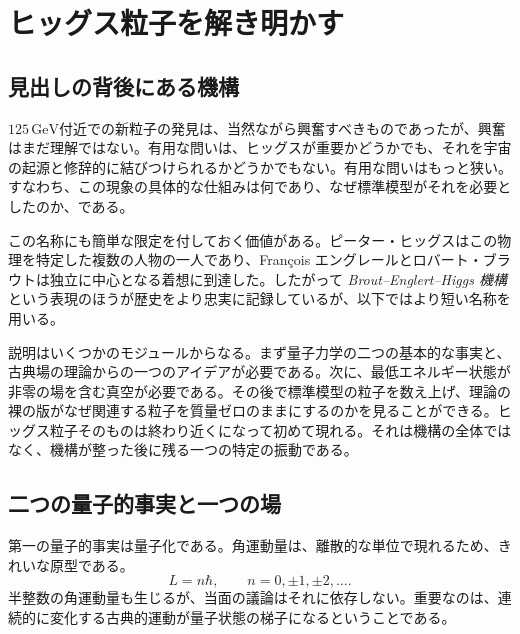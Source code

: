 \chapter{ヒッグス粒子を解き明かす}


\section{見出しの背後にある機構}

$125\,\mathrm{GeV}$付近での新粒子の発見は、当然ながら興奮すべきものであったが、興奮はまだ理解ではない。有用な問いは、ヒッグスが重要かどうかでも、それを宇宙の起源と修辞的に結びつけられるかどうかでもない。有用な問いはもっと狭い。すなわち、この現象の具体的な仕組みは何であり、なぜ標準模型がそれを必要としたのか、である。

この名称にも簡単な限定を付しておく価値がある。ピーター・ヒッグスはこの物理を特定した複数の人物の一人であり、Fran\c{c}ois エングレールとロバート・ブラウトは独立に中心となる着想に到達した。したがって \emph{Brout--Englert--Higgs 機構} という表現のほうが歴史をより忠実に記録しているが、以下ではより短い名称を用いる。

説明はいくつかのモジュールからなる。まず量子力学の二つの基本的な事実と、古典場の理論からの一つのアイデアが必要である。次に、最低エネルギー状態が非零の場を含む真空が必要である。その後で標準模型の粒子を数え上げ、理論の裸の版がなぜ関連する粒子を質量ゼロのままにするのかを見ることができる。ヒッグス粒子そのものは終わり近くになって初めて現れる。それは機構の全体ではなく、機構が整った後に残る一つの特定の振動である。

\section{二つの量子的事実と一つの場}

第一の量子的事実は量子化である。角運動量は、離散的な単位で現れるため、きれいな原型である。
\begin{equation}
L=n\hbar,
\qquad
n=0,\pm1,\pm2,\ldots .
\end{equation}
半整数の角運動量も生じるが、当面の議論はそれに依存しない。重要なのは、連続的に変化する古典的運動が量子状態の梯子になるということである。

